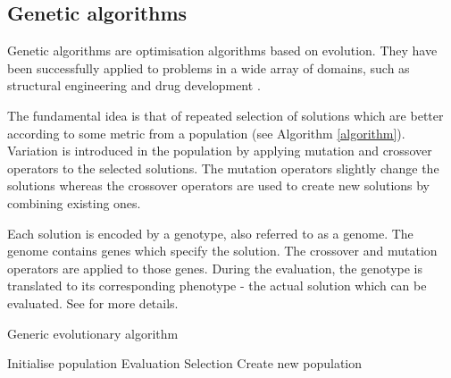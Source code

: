 \subsection{Genetic algorithms}
Genetic algorithms are optimisation algorithms based on evolution. They have been successfully
applied to problems in a wide array of domains, such as structural engineering \cite{engineering_gas}
and drug development \cite{drug_gas}.

The fundamental idea is that of repeated selection of solutions which are better according to
some metric from a population (see Algorithm \ref{algorithm}).
Variation is introduced in the population by applying mutation and crossover operators to the
selected solutions. The mutation operators slightly change the solutions whereas the crossover
operators are used to create new solutions by combining existing ones.

Each solution is encoded by a genotype, also referred to as a genome. The genome contains
genes which specify the solution. The crossover and mutation operators are applied to those genes.
During the evaluation, the genotype is translated to its corresponding phenotype -
the actual solution which can be evaluated. See \cite{compint} for more details.


\begin{algorithm}[H]
    \caption{Generic evolutionary algorithm}
    \begin{algorithmic}

    \State Initialise population
        \State Evaluation 
        \State Selection  
        \State Create new population 
    \EndWhile
\EndProcedure

\end{algorithmic}
\label{algorithm}
\end{algorithm}
